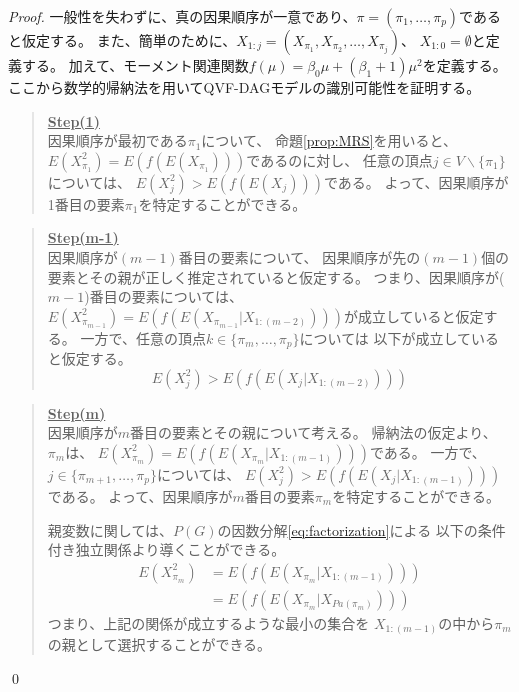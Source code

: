 \begin{proof}
  一般性を失わずに、真の因果順序が一意であり、$\pi = (\pi_1, \dots, \pi_p)$であると仮定する。
  また、簡単のために、$X_{1:j} = (X_{\pi_1}, X_{\pi_2}, \dots, X_{\pi_j})$、
  $X_{1:0} = \emptyset$と定義する。
  加えて、モーメント関連関数$f(\mu) = \beta_0 \mu + (\beta_1 + 1)\mu^2$を定義する。
  ここから数学的帰納法を用いてQVF-DAGモデルの識別可能性を証明する。

  \begin{quote}
    \underline{\textbf{Step(1)}} \\
    因果順序が最初である$\pi_1$について、
    命題\ref{prop:MRS}を用いると、
    $E(X_{\pi_1}^2) = E(f(E(X_{\pi_1})))$であるのに対し、
    任意の頂点$j \in V \backslash \{ \pi_1 \}$については、
    $E(X_j ^2) > E(f(E(X_j)))$である。
    よって、因果順序が1番目の要素$\pi_1$を特定することができる。
  \end{quote}

  \begin{quote}
    \underline{\textbf{Step(m-1)}} \\
    因果順序が$(m-1)$番目の要素について、
    因果順序が先の$(m-1)$個の要素とその親が正しく推定されていると仮定する。
    つまり、因果順序が($m-1$)番目の要素については、
    $E(X_{\pi_{m-1}}^2) = E(f(E(X_{\pi_{m-1}} | X_{1:(m-2)})))$が成立していると仮定する。
    一方で、任意の頂点$k \in \{\pi_m, \dots, \pi_p \}$については
    以下が成立していると仮定する。
    \begin{equation*}
      E(X_j^2) > E(f(E(X_j | X_{1:(m-2)})))
    \end{equation*}
  \end{quote}

  \begin{quote}
    \underline{\textbf{Step(m)}} \\
    因果順序が$m$番目の要素とその親について考える。
    帰納法の仮定より、$\pi_m$は、
    $E(X_{\pi_m}^2) = E(f(E(X_{\pi_m} | X_{1:(m-1)})))$である。
    一方で、$j \in \{ \pi_{m+1}, \dots, \pi_p \}$については、
    $E(X_j^2) > E(f(E(X_j | X_{1:(m-1)})))$である。
    よって、因果順序が$m$番目の要素$\pi_m$を特定することができる。

    親変数に関しては、$P(G)$の因数分解\eqref{eq:factorization}による
    以下の条件付き独立関係より導くことができる。
    \begin{align*}
      E(X_{\pi_m}^2) &= E(f(E(X_{\pi_m} | X_{1:(m-1)}))) \\
                     &= E(f(E(X_{\pi_m} | X_{Pa(\pi_m)})))
    \end{align*}
    つまり、上記の関係が成立するような最小の集合を
    $X_{1:(m-1)}$の中から$\pi_m$の親として選択することができる。
  \end{quote}
\qed
\end{proof}

